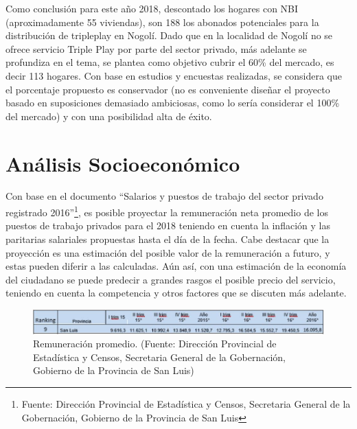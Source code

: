 \documentclass[12pt,a4paper]{book}
\begin{document}
\medskip 

Como conclusión para este año 2018, descontado los hogares con NBI (aproximadamente 55 viviendas), son 188 los abonados potenciales para la distribución de tripleplay en Nogolí. Dado que en la localidad de Nogolí no se ofrece servicio Triple Play por parte del sector privado, más adelante se profundiza en el tema, se plantea como objetivo cubrir el 60\% del mercado, es decir 113 hogares. Con base en estudios y encuestas realizadas, se considera que el porcentaje propuesto es conservador (no es conveniente diseñar el proyecto basado en suposiciones demasiado ambiciosas, como lo sería considerar el 100\% del mercado) y con una posibilidad alta de éxito.


\section{Análisis Socioeconómico} \label{sec_analisis_socieconomico}

Con base en el documento “Salarios y puestos de trabajo del sector privado registrado 2016”\footnote{Fuente: Dirección Provincial de Estadística y Censos, Secretaria General de la Gobernación, Gobierno de la Provincia de San Luis}, es posible proyectar la remuneración neta promedio de los puestos de trabajo privados para el 2018 teniendo en cuenta la inflación y las paritarias salariales propuestas hasta el día de la fecha. Cabe destacar que la proyección es una estimación del posible valor de la remuneración a futuro, y estas pueden diferir a las calculadas. Aún así, con una estimación de la economía del ciudadano se puede predecir a grandes rasgos el posible precio del servicio, teniendo en cuenta la competencia y otros factores que se discuten más adelante.


\begin{figure} [H]
\centering
\includegraphics[width= 15cm]{../figuras/4_2_Fig1.jpg}
\caption{Remuneración promedio. (Fuente: Dirección Provincial de Estadística y Censos, Secretaria General de la Gobernación, Gobierno de la Provincia de San Luis)}
\label{fig_rem_prom}
\end{figure}
\end{document}
